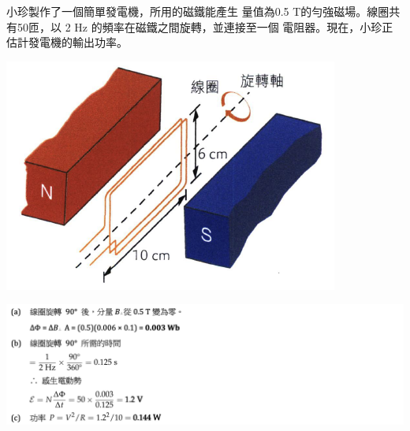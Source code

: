 {
    小珍製作了一個簡單發電機，所用的磁鐵能產生 量值為0.5 T的勻強磁場。線圈共有50匝，以 2 Hz 的頻率在磁鐵之間旋轉，並連接至一個   電阻器。現在，小珍正估計發電機的輸出功率。
    \par{\par\centering\includegraphics[width=.3\textwidth]{./img/ch5_induction_lq_2024-06-24-17-11-57.png}\par}

}{\par{\par\centering\includegraphics[width=\textwidth]{./img/ch5_induction_lq_2024-06-24-17-39-28.png}\par}}

